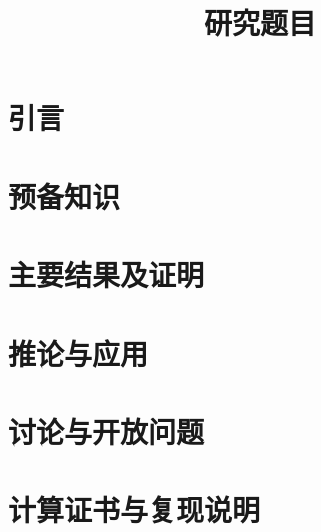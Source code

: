 \documentclass[UTF8,11pt,a4paper]{ctexart}
\title{研究题目}
\author{} %
\date{}
\theoremstyle{definition}
\theoremstyle{remark}
\numberwithin{equation}{section}
\begin{document}
\maketitle
\begin{abstract}
\end{abstract}
\section{引言}
\section{预备知识}
\section{主要结果及证明}
\section{推论与应用}
\section{讨论与开放问题}
\appendix
\section{计算证书与复现说明}
\end{document}
